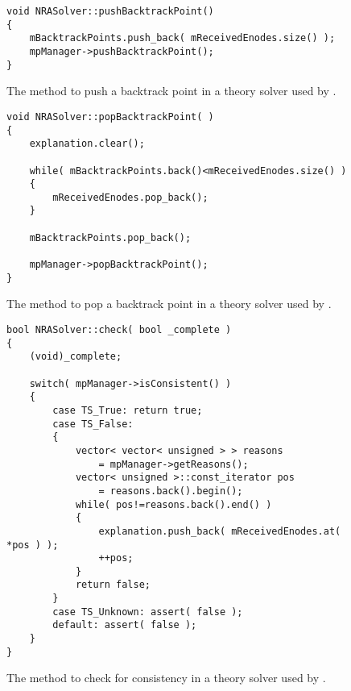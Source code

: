 \begin{figure}[htb]
\caption{The method to push a backtrack point in a theory solver used by \opensmt.}
\label{fig:pushBacktrackPointnrasolver}
\begin{verbatim}
void NRASolver::pushBacktrackPoint()
{
    mBacktrackPoints.push_back( mReceivedEnodes.size() );
    mpManager->pushBacktrackPoint();
}
\end{verbatim}
\end{figure}

\begin{figure}[htb]
\caption{The method to pop a backtrack point in a theory solver used by \opensmt.}
\label{fig:popBacktrackPointnrasolver}
\begin{verbatim}
void NRASolver::popBacktrackPoint( )
{
    explanation.clear();

    while( mBacktrackPoints.back()<mReceivedEnodes.size() )
    {
        mReceivedEnodes.pop_back();
    }

    mBacktrackPoints.pop_back();

    mpManager->popBacktrackPoint();
}
\end{verbatim}
\end{figure}

\begin{figure}[htb]
\caption{The method to check for consistency in a theory solver used by \opensmt.}
\label{fig:checknrasolver}
\begin{verbatim}
bool NRASolver::check( bool _complete )
{
    (void)_complete;

    switch( mpManager->isConsistent() )
    {
        case TS_True: return true;
        case TS_False:
        {
            vector< vector< unsigned > > reasons
                = mpManager->getReasons();
            vector< unsigned >::const_iterator pos
                = reasons.back().begin();
            while( pos!=reasons.back().end() )
            {
                explanation.push_back( mReceivedEnodes.at( *pos ) );
                ++pos;
            }
      	    return false;
        }
        case TS_Unknown: assert( false );
        default: assert( false );
    }
}
\end{verbatim}
\end{figure}

